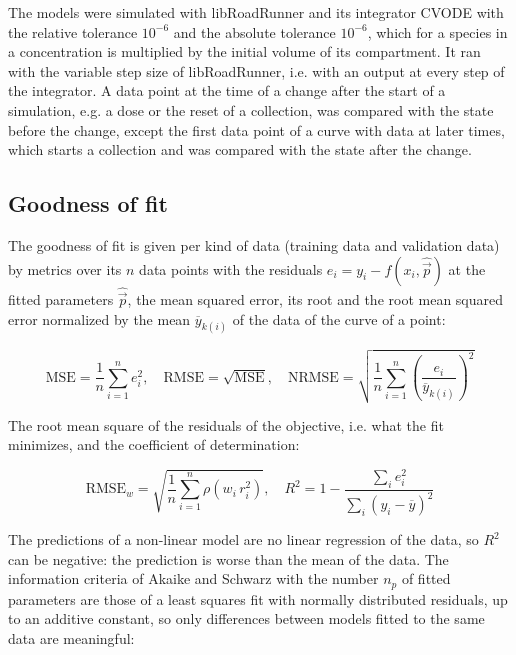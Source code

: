 \documentclass{article}
\begin{document}
The models were simulated with libRoadRunner \cite{Welsh2023} and its integrator CVODE \cite{Hindmarsh2005} with the relative tolerance $10^{-6}$ and the absolute tolerance $10^{-6}$, which for a species in a concentration is multiplied by the initial volume of its compartment. It ran with the variable step size of libRoadRunner, i.e. with an output at every step of the integrator. A data point at the time of a change after the start of a simulation, e.g. a dose or the reset of a collection, was compared with the state before the change, except the first data point of a curve with data at later times, which starts a collection and was compared with the state after the change.

\subsection{Goodness of fit}

The goodness of fit is given per kind of data (training data and validation data) by metrics over its $n$ data points with the residuals $e_i = y_i - f(x_i, \hat{\vec{p}})$ at the fitted parameters $\hat{\vec{p}}$, the mean squared error, its root and the root mean squared error normalized by the mean $\overline{y}_{k(i)}$ of the data of the curve of a point:

\begin{equation}
\mathrm{MSE} = \frac{1}{n} \sum_{i=1}^{n} e_i^2, \quad \mathrm{RMSE} = \sqrt{\mathrm{MSE}}, \quad \mathrm{NRMSE} = \sqrt{\frac{1}{n} \sum_{i=1}^{n} \left(\frac{e_i}{\overline{y}_{k(i)}}\right)^2}
\end{equation}

The root mean square of the residuals of the objective, i.e. what the fit minimizes, and the coefficient of determination:

\begin{equation}
\mathrm{RMSE}_w = \sqrt{\frac{1}{n} \sum_{i=1}^{n} \rho\left(w_i\, r_i^2\right)}, \quad R^2 = 1 - \frac{\sum_{i} e_i^2}{\sum_{i} \left(y_i - \overline{y}\right)^2}
\end{equation}

The predictions of a non-linear model are no linear regression of the data, so $R^2$ can be negative: the prediction is worse than the mean of the data. The information criteria of Akaike \cite{Akaike1974} and Schwarz \cite{Schwarz1978} with the number $n_p$ of fitted parameters are those of a least squares fit with normally distributed residuals, up to an additive constant, so only differences between models fitted to the same data are meaningful:
\end{document}
